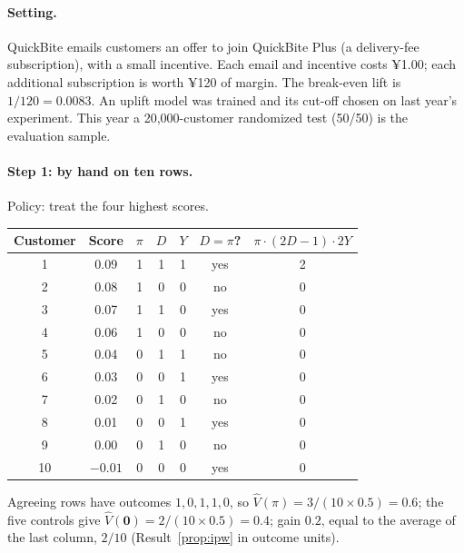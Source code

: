 \documentclass[11pt]{article}
\begin{document}
\paragraph{Setting.} QuickBite emails customers an offer to join QuickBite Plus (a delivery-fee subscription), with a
small incentive. Each email and incentive costs ¥1.00; each additional subscription is worth ¥120 of margin.
The break-even lift is $1/120 = 0.0083$. An uplift model was trained and its cut-off chosen on last year's experiment. This
year a 20{,}000-customer randomized test (50/50) is the evaluation sample.

\paragraph{Step 1: by hand on ten rows.} Policy: treat the four highest scores.
\begin{center}
\begin{tabular}{ccccccc}
\toprule
Customer & Score & $\pi$ & $D$ & $Y$ & $D = \pi$? & $\pi \cdot (2D-1)\cdot 2Y$ \\
\midrule
1 & 0.09 & 1 & 1 & 1 & yes & 2 \\
2 & 0.08 & 1 & 0 & 0 & no & 0 \\
3 & 0.07 & 1 & 1 & 0 & yes & 0 \\
4 & 0.06 & 1 & 0 & 0 & no & 0 \\
5 & 0.04 & 0 & 1 & 1 & no & 0 \\
6 & 0.03 & 0 & 0 & 1 & yes & 0 \\
7 & 0.02 & 0 & 1 & 0 & no & 0 \\
8 & 0.01 & 0 & 0 & 1 & yes & 0 \\
9 & 0.00 & 0 & 1 & 0 & no & 0 \\
10 & $-0.01$ & 0 & 0 & 0 & yes & 0 \\
\bottomrule
\end{tabular}
\end{center}
Agreeing rows have outcomes $1, 0, 1, 1, 0$, so $\hat V(\pi) = 3/(10 \times 0.5) = 0.6$; the five controls give
$\hat V(\mathbf 0) = 2/(10 \times 0.5) = 0.4$; gain $0.2$, equal to the average of the last column, $2/10$
(Result~\ref{prop:ipw} in outcome units).
\end{document}
